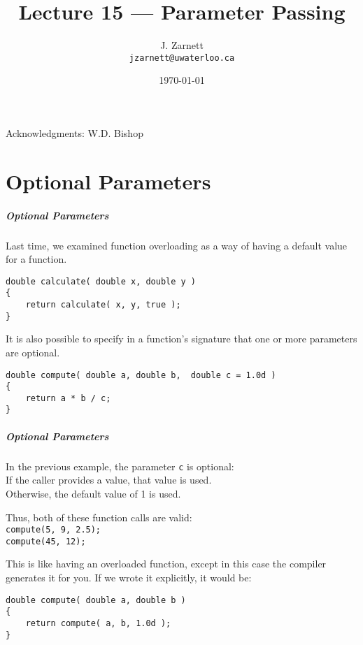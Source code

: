 

\title{Lecture 15 --- Parameter Passing}

\author{J. Zarnett\\
\texttt{jzarnett@uwaterloo.ca}}
\date{\today}



\begin{frame}
  \titlepage
  
  \begin{center}
  \small{Acknowledgments: W.D. Bishop}
  \end{center}
 \end{frame}

\part{Optional Parameters}
\begin{frame}\partpage\end{frame}

\begin{frame}[fragile]
\frametitle{Optional Parameters}
Last time, we examined function overloading as a way of having a default value for a function.

\begin{verbatim}
double calculate( double x, double y )
{
    return calculate( x, y, true );
}
\end{verbatim}

It is also possible to specify in a function's signature that one or more parameters are optional.

\begin{verbatim}
double compute( double a, double b,  double c = 1.0d )
{
    return a * b / c;
}
\end{verbatim}

\end{frame}

\begin{frame}[fragile]
\frametitle{Optional Parameters}
In the previous example, the parameter \texttt{c} is optional:\\
\quad If the caller provides a value, that value is used.\\
\quad Otherwise, the default value of 1 is used.

Thus, both of these function calls are valid:\\
\quad \texttt{compute(5, 9, 2.5);}\\
\quad \texttt{compute(45, 12);}

This is like having an overloaded function, except in this case the compiler generates it for you. If we wrote it explicitly, it would be:

\begin{verbatim}
double compute( double a, double b )
{
    return compute( a, b, 1.0d );
}
\end{verbatim}

\end{frame}

